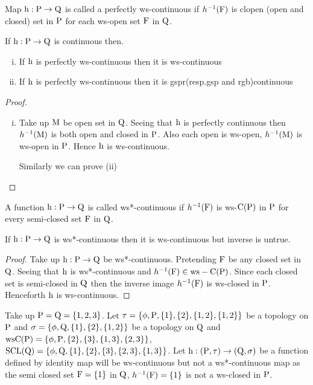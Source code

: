 \begin{dfn}\label{defi3.2.5}
Map $\mathrm{h}: \mathrm{P}\to \mathrm{Q}$ is called a perfectly ws-continuous if $h^{-1} (\mathrm{F})$ is clopen (open and closed) set in $\mathrm{P}$ for each ws-open set $\mathrm{F}$ in $\mathrm{Q}$.
\end{dfn}

\begin{thm}\label{thm3.2.11}
If $\mathrm{h}: \mathrm{P}\to \mathrm{Q}$ is continuous then.
\begin{enumerate}[(i)]
\item If $\mathrm{h}$ is perfectly ws-continuous then it is ws-continuous
\item If $\mathrm{h}$ is perfectly ws-continuous then it is gspr(resp.gsp and rgb)continuous
\end{enumerate}
\end{thm}

\begin{proof}
\begin{enumerate}[(i)]
\item Take up $\mathrm{M}$ be open set in $\mathrm{Q}$. Seeing that $\mathrm{h}$ is perfectly continuous then $h^{-1} (\mathrm{M})$ is both open and closed in $\mathrm{P}$. Also each open is ws-open, $h^{-1} (\mathrm{M})$ is ws-open in $\mathrm{P}$. Hence $\mathrm{h}$ is ws-continuous.

Similarly we can prove (ii)
\end{enumerate}
\end{proof}

\begin{dfn}\label{defi3.2.6}
A function $\mathrm{h}: \mathrm{P}\to \mathrm{Q}$ is called ws*-continuous if $h^{-1} (\mathrm{F})$ is ws-$\mathrm{C}(\mathrm{P})$ in $\mathrm{P}$ for every semi-closed set $\mathrm{F}$ in $\mathrm{Q}$.
\end{dfn}

\begin{thm}\label{thm3.2.12}
If $\mathrm{h}: \mathrm{P}\to \mathrm{Q}$ is ws*-continuous then it is ws-continuous but inverse is untrue.
\end{thm}

\begin{proof}
Take up $\mathrm{h}: \mathrm{P}\to \mathrm{Q}$ be ws*-continuous. Pretending $\mathrm{F}$ be any closed set in $\mathrm{Q}$. Seeing that $\mathrm{h}$ is ws*-continuous and $h^{-1} (\mathrm{F}) \in \mathrm{ws}-\mathrm{C}(\mathrm{P})$. Since each closed set is semi-closed in $\mathrm{Q}$ then the inverse image $h^{-1}(\mathrm{F})$ is ws-closed in $\mathrm{P}$. Henceforth $\mathrm{h}$ is ws-continuous.
\end{proof}

\begin{exm}\label{exam3.2.10}
Take up $\mathrm{P}=\mathrm{Q}= \{1, 2, 3\}$. Let $\tau = \{\phi, \mathrm{P}, \{1\}, \{2\}, \{1, 2\},\{1,2\}\}$ be a topology on $\mathrm{P}$ and $\sigma =\{\phi, \mathrm{Q}, \{1\}, \{2\},\{1,2\}\}$ be a topology on $\mathrm{Q}$ and $\mathrm{ws}\mathrm{C}(\mathrm{P})= \{\phi, \mathrm{P}, \{2\},\{3\}, \{1, 3\},\{2,3\}\}$, $\mathrm{SCL}(\mathrm{Q})= \{\phi, \mathrm{Q}, \{1\}, \{2\},\{3\}, \{2, 3\},\{1,3\}\}$. Let $\mathrm{h}: (\mathrm{P},\tau )\to (\mathrm{Q}, \sigma)$ be a function defined by identity map will be ws-continuous but not a ws*-continuous map as the semi closed set $\mathrm{F}=\{1\}$ in $\mathrm{Q}$, $h^{-1} (\mathrm{F})=\{1\}$ is not a ws-closed in $\mathrm{P}$.
\end{exm}

